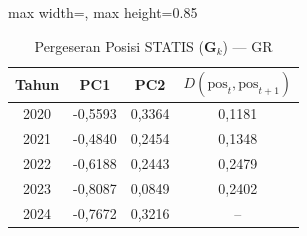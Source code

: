 \begin{table}[H]
\centering
\caption{Pergeseran Posisi STATIS ($\mathbf{G}_k$) --- GR} \label{tab:app2jarak_statis_loading_gr}
\begin{adjustbox}{max width=\textwidth, max height=0.85\textheight}
\begin{tabular}{|c|c|c|c|}
\hline
\textbf{Tahun} & \textbf{PC1} & \textbf{PC2} & \textbf{$D(\text{pos}_t, \text{pos}_{t+1})$} \\
\hline
2020 & -0,5593 & 0,3364 & 0,1181 \\
2021 & -0,4840 & 0,2454 & 0,1348 \\
2022 & -0,6188 & 0,2443 & 0,2479 \\
2023 & -0,8087 & 0,0849 & 0,2402 \\
2024 & -0,7672 & 0,3216 & -- \\
\hline
\end{tabular}
\end{adjustbox}
\end{table}